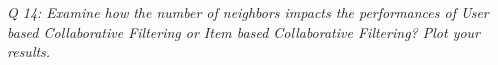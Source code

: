 \documentclass[journal,onecolumn]{IEEEtran}
\begin{document}

\textit{Q 14: Examine how the number of neighbors impacts the performances of User based Collaborative
Filtering or Item based Collaborative Filtering? Plot your results.} \\
\end{document}

